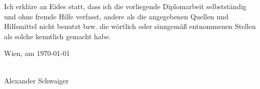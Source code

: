 \thispagestyle{empty}
\vspace*{2cm}

Ich erkläre an Eides statt, dass ich die vorliegende Diplomarbeit selbstständig und ohne fremde Hilfe verfasst, andere als die angegebenen Quellen und Hilfsmittel nicht benutzt bzw. die wörtlich oder sinngemäß entnommenen Stellen als solche kenntlich gemacht habe.

\vspace*{3cm}

\noindent
Wien, am {\today} %
%
\hfill 
%
\begin{minipage}[t]{5cm}
	\centering
\underline{\hspace*{5cm}}\\
\small {Alexander Schwaiger}
\end{minipage}